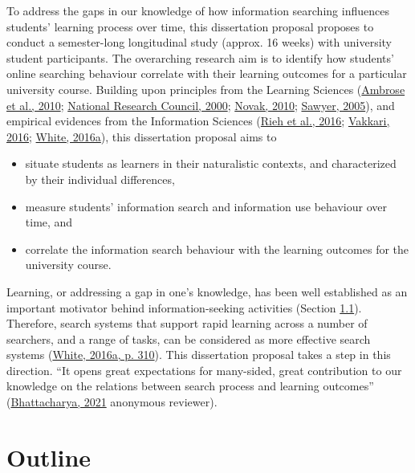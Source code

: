 \documentclass[a4paper, nobind]{templates/ociamthesis}
\providecommand{\tightlist}{%
  \setlength{\itemsep}{0pt}\setlength{\parskip}{0pt}}
\begin{document}
To address the gaps in our knowledge of how information searching
influences students' learning process over time, this dissertation
proposal proposes to conduct a semester-long longitudinal study (approx.
16 weeks) with university student participants. The overarching research
aim is to identify how students' online searching behaviour correlate
with their learning outcomes for a particular university course.
Building upon principles from the Learning Sciences
(\protect\hyperlink{ref-ambrose2010howa}{Ambrose et al., 2010}; \protect\hyperlink{ref-council2000how}{National Research Council, 2000}; \protect\hyperlink{ref-novak2010learninga}{Novak, 2010}; \protect\hyperlink{ref-sawyer2005cambridge}{Sawyer, 2005}),
and empirical evidences from the Information Sciences
(\protect\hyperlink{ref-rieh2016searching}{Rieh et al., 2016}; \protect\hyperlink{ref-vakkari2016searching}{Vakkari, 2016}; \protect\hyperlink{ref-white2016interactions}{White, 2016a}),
this dissertation proposal aims to

\begin{itemize}
\tightlist
\item
  situate students as learners in their naturalistic contexts, and
  characterized by their individual differences,
\item
  measure students' information search and information use behaviour
  over time, and
\item
  correlate the information search behaviour with the learning
  outcomes for the university course.
\end{itemize}

Learning, or addressing a gap in one's knowledge, has been well
established as an important motivator behind information-seeking
activities (Section \protect\hyperlink{sec_intro_overview}{1.1}). Therefore, search systems that support
rapid learning across a number of searchers, and a range of tasks, can
be considered as more effective search systems (\protect\hyperlink{ref-white2016interactions}{White, 2016a, p. 310}). This dissertation proposal takes a step in this direction. ``It
opens great expectations for many-sided, great contribution to our
knowledge on the relations between search process and learning outcomes''
(\protect\hyperlink{ref-bhattacharya2021longitudinal}{Bhattacharya, 2021} anonymous reviewer).

\hypertarget{sec_intro_outline}{%
\section{Outline}\label{sec_intro_outline}}
\end{document}
